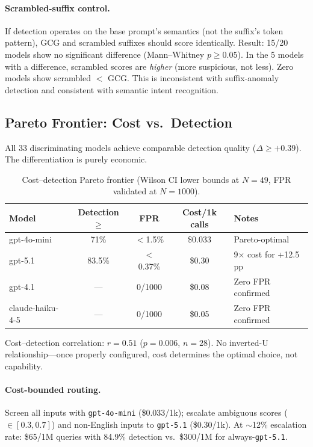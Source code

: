 \documentclass{article}
\begin{document}
\paragraph{Scrambled-suffix control.} If detection operates on the base prompt's semantics (not the suffix's token pattern), GCG and scrambled suffixes should score identically. Result: 15/20 models show no significant difference (Mann--Whitney $p \geq 0.05$). In the 5 models with a difference, scrambled scores are \emph{higher} (more suspicious, not less). Zero models show scrambled $<$ GCG. This is inconsistent with suffix-anomaly detection and consistent with semantic intent recognition.

\subsection{Pareto Frontier: Cost vs.\ Detection}
\label{sec:pareto}

All 33 discriminating models achieve comparable detection quality ($\Delta \geq +0.39$). The differentiation is purely economic.

\begin{table}[t]
\caption{Cost--detection Pareto frontier (Wilson CI lower bounds at $N{=}49$, FPR validated at $N{=}1000$).}
\label{tab:pareto}
\centering
\small
\begin{tabular}{lcccl}
\toprule
\textbf{Model} & \textbf{Detection $\geq$} & \textbf{FPR} & \textbf{Cost/1k calls} & \textbf{Notes} \\
\midrule
gpt-4o-mini & 71\% & $<$1.5\% & \$0.033 & Pareto-optimal \\
gpt-5.1 & 83.5\% & $<$0.37\% & \$0.30 & 9$\times$ cost for +12.5 pp \\
gpt-4.1 & --- & 0/1000 & \$0.08 & Zero FPR confirmed \\
claude-haiku-4-5 & --- & 0/1000 & \$0.05 & Zero FPR confirmed \\
\bottomrule
\end{tabular}
\end{table}

Cost--detection correlation: $r = 0.51$ ($p = 0.006$, $n{=}28$). No inverted-U relationship---once properly configured, cost determines the optimal choice, not capability.

\paragraph{Cost-bounded routing.} Screen all inputs with \texttt{gpt-4o-mini} (\$0.033/1k); escalate ambiguous scores ($\in [0.3, 0.7]$) and non-English inputs to \texttt{gpt-5.1} (\$0.30/1k). At ${\sim}$12\% escalation rate: \$65/1M queries with 84.9\% detection vs.\ \$300/1M for always-\texttt{gpt-5.1}.
\end{document}
